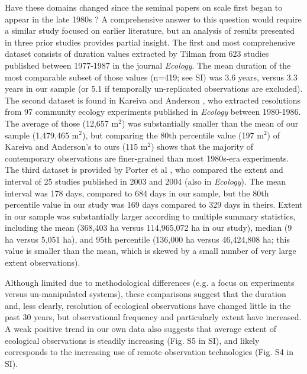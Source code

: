 \documentclass[12pt]{article}
\begin{document}
Have these domains changed since the seminal papers on scale first began to appear in the late 1980s \cite{wiens_spatial_1989, levin_problem_1992, tilman_ecological_1989}? A comprehensive answer to this question would require a similar study focused on earlier literature, but an analysis of results presented in three prior studies provides partial insight. The first and most comprehensive dataset consists of duration values extracted by Tilman \cite{tilman_ecological_1989} from 623 studies published between 1977-1987 in the journal \emph{Ecology}. The mean duration of the most comparable subset of those values (n=419; see SI) was 3.6 years, versus 3.3 years in our sample (or 5.1 if temporally un-replicated observations are excluded). The second dataset is found in Kareiva and Anderson \cite{kareiva_spatial_1988}, who extracted resolutions from 97 community ecology experiments published in \emph{Ecology} between 1980-1986. The average of those (12,657 m$^2$) was substantially smaller than the mean of our sample (1,479,465 m$^2$), but comparing the 80th percentile value (197 m$^2$) of Kareiva and Anderson's \cite{kareiva_spatial_1988} to ours (115 m$^2$) shows that the majority of contemporary observations are finer-grained than most 1980s-era experiments. The third dataset is provided by Porter et al \cite{porter_wireless_2005}, who compared the extent and interval of 25 studies published in 2003 and 2004 (also in \emph{Ecology}). The mean interval was 178 days, compared to 684 days in our sample, but the 80th percentile value in our study was 169 days compared to 329 days in theirs. Extent in our sample was substantially larger according to multiple summary statistics, including the mean (368,403 ha versus 114,965,072 ha in our study), median (9 ha versus 5,051 ha), and 95th percentile (136,000 ha versus 46,424,808 ha; this value is smaller than the mean, which is skewed by a small number of very large extent observations). 

Although limited due to methodological differences (e.g. a focus on experiments versus un-manipulated systems), these comparisons suggest that the duration and, less clearly, resolution of ecological observations have changed little in the past 30 years, but observational frequency and particularly extent have increased. A weak positive trend in our own data also suggests that average extent of ecological observations is steadily increasing (Fig. S5 in SI), and likely corresponds to the increasing use of remote observation technologies (Fig. S4 in SI).  
\end{document}
